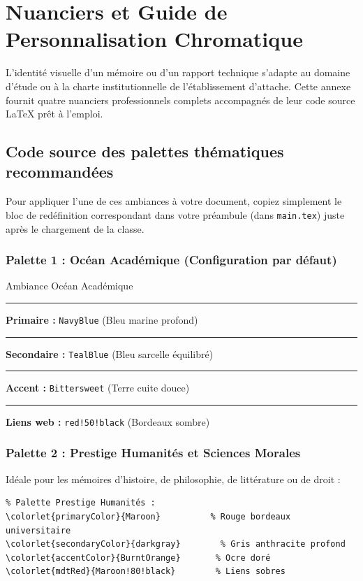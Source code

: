 \chapter{Nuanciers et Guide de Personnalisation Chromatique}
\label{annexe:guide_palettes}

L'identité visuelle d'un mémoire ou d'un rapport technique s'adapte au domaine d'étude ou à la charte institutionnelle de l'établissement d'attache.
Cette annexe fournit quatre nuanciers professionnels complets accompagnés de leur code source \LaTeX{} prêt à l'emploi.

\section{Code source des palettes thématiques recommandées}
\label{sec:code_palettes}

Pour appliquer l'une de ces ambiances à votre document, copiez simplement le bloc de redéfinition correspondant dans votre préambule (dans \texttt{main.tex}) juste après le chargement de la classe.

\subsection{Palette 1 : Océan Académique (Configuration par défaut)}
\begin{boiteSynthese}{Ambiance Océan Académique}
  \textcolor{NavyBlue}{\rule{12pt}{12pt}} \textbf{Primaire :} \texttt{NavyBlue} (Bleu marine profond)\\
  \textcolor{TealBlue}{\rule{12pt}{12pt}} \textbf{Secondaire :} \texttt{TealBlue} (Bleu sarcelle équilibré)\\
  \textcolor{Bittersweet}{\rule{12pt}{12pt}} \textbf{Accent :} \texttt{Bittersweet} (Terre cuite douce)\\
  \textcolor{red!50!black}{\rule{12pt}{12pt}} \textbf{Liens web :} \texttt{red!50!black} (Bordeaux sombre)
\end{boiteSynthese}

\subsection{Palette 2 : Prestige Humanités et Sciences Morales}
Idéale pour les mémoires d'histoire, de philosophie, de littérature ou de droit :
\begin{verbatim}
% Palette Prestige Humanités :
\colorlet{primaryColor}{Maroon}          % Rouge bordeaux universitaire
\colorlet{secondaryColor}{darkgray}        % Gris anthracite profond
\colorlet{accentColor}{BurntOrange}       % Ocre doré
\colorlet{mdtRed}{Maroon!80!black}        % Liens sobres
\end{verbatim}

